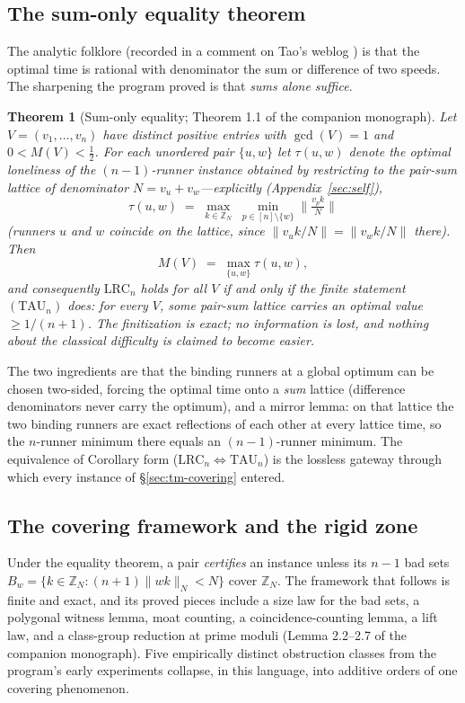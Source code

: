 \documentclass[11pt,a4paper]{article}
\numberwithin{equation}{section}
\theoremstyle{plain}
\newtheorem{theorem}{Theorem}[section]
\theoremstyle{definition}
\theoremstyle{remark}
\newcommand{\Z}{\mathbb{Z}}
\newcommand{\wn}[1]{\lVert #1 \rVert_{N}}
\newcommand{\wnc}[1]{\lVert #1 \rVert}
\newcommand{\lrc}{\mathrm{LRC}}
\newcommand{\taust}{\mathrm{TAU}}
\begin{document}
\subsection{The sum-only equality theorem}

The analytic folklore (recorded in a comment on Tao's weblog
\cite{Tao-blog}) is that the optimal time is rational with denominator
the sum or difference of two speeds. The sharpening the program proved
is that \emph{sums alone suffice}.

\begin{theorem}[Sum-only equality; Theorem 1.1 of the companion
monograph]\label{thm:equality}
Let $V=(v_1,\dots,v_n)$ have distinct positive entries with
$\gcd(V)=1$ and $0<M(V)<\tfrac12$. For each unordered pair $\{u,w\}$
let $\tau(u,w)$ denote the optimal loneliness of the $(n-1)$-runner
instance obtained by restricting to the pair-sum lattice of denominator
$N=v_u+v_w$---explicitly (Appendix~\ref{sec:self}),
\[
\tau(u,w)\;=\;\max_{k\in\Z_{N}}\;\min_{p\in[n]\setminus\{w\}}
\wnc{\tfrac{v_pk}{N}}
\]
(runners $u$ and $w$ coincide on the lattice, since
$\wnc{v_uk/N}=\wnc{v_wk/N}$ there). Then
\[
M(V)\;=\;\max_{\{u,w\}}\tau(u,w),
\]
and consequently $\lrc_n$ holds for all $V$ if and only if the finite
statement $(\taust_n)$ does: for every $V$, some pair-sum lattice
carries an optimal value $\ge 1/(n+1)$. The finitization is exact; no
information is lost, and nothing about the classical difficulty is
claimed to become easier.
\end{theorem}

The two ingredients are that the binding runners at a global optimum can
be chosen two-sided, forcing the optimal time onto a \emph{sum} lattice
(difference denominators never carry the optimum), and a mirror lemma:
on that lattice the two binding runners are exact reflections of each
other at every lattice time, so the $n$-runner minimum there equals an
$(n-1)$-runner minimum. The equivalence of Corollary form
($\lrc_n\iff\taust_n$) is the lossless gateway through which every
instance of \S\ref{sec:tm-covering} entered.

\subsection{The covering framework and the rigid zone}

Under the equality theorem, a pair \emph{certifies} an instance unless
its $n-1$ bad sets $B_w=\{k\in\Z_N:(n{+}1)\wn{wk}<N\}$ cover $\Z_N$.
The framework that follows is finite and exact, and its proved pieces
include a size law for the bad sets, a polygonal witness lemma, moat
counting, a coincidence-counting lemma, a lift law, and a class-group
reduction at prime moduli (Lemma 2.2--2.7 of the companion
monograph). Five empirically distinct obstruction classes from the
program's early experiments collapse, in this language, into additive
orders of one covering phenomenon.
\end{document}

